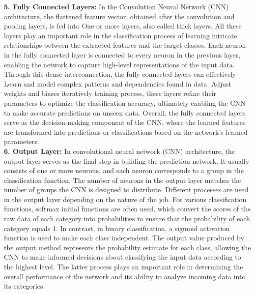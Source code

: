 \textbf{5. Fully Connected Layers:}
 In the Convolution Neural Network (CNN) architecture, the flattened feature vector, obtained after the convolution and pooling layers, is fed into One or more layers, also called thick layers. All these layers play an important role in the classification process of learning intricate relationships between the extracted features and the target classes. Each neuron in the fully connected layer is connected to every neuron in the previous layer, enabling the network to capture high-level representations of the input data. Through this dense interconnection, the fully connected layers can effectively Learn and model complex patterns and dependencies found in data. Adjust weights and biases iteratively training process, these layers refine their parameters to optimize the classification accuracy, ultimately enabling the CNN to make accurate predictions on unseen data. Overall, the fully connected layers serve as the decision-making component of the CNN, where the learned features are transformed into predictions or classifications based on the network's learned parameters.
\\

\textbf{6. Output Layer:}
In convolutional neural network (CNN) architecture, the output layer serves as the final step in building the prediction network. It usually consists of one or more neurons, and each neuron corresponds to a group in the classification function. The number of neurons in the output layer matches the number of groups the CNN is designed to distribute. Different processes are used in the output layer depending on the nature of the job. For various classification functions, softmax initial functions are often used, which convert the scores of the raw data of each category into probabilities to ensure that the probability of each category equals 1. In contrast, in binary classification, a sigmoid activation function is used to make each class independent. The output value produced by the output method represents the probability estimate for each class, allowing the CNN to make informed decisions about classifying the input data according to the highest level. The latter process plays an important role in determining the overall performance of the network and its ability to analyze incoming data into its categories.

